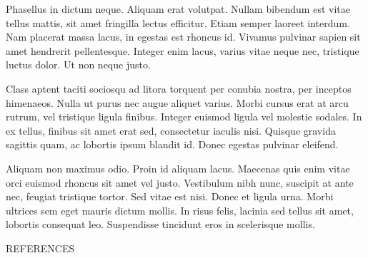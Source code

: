 \documentclass[10pt]{article}
\begin{document}
\begin{multicols}{2}
Phasellus in dictum neque. Aliquam erat volutpat. Nullam bibendum est vitae tellus mattis, sit amet fringilla lectus efficitur. Etiam semper laoreet interdum. Nam placerat massa lacus, in egestas est rhoncus id. Vivamus pulvinar sapien sit amet hendrerit pellentesque. Integer enim lacus, varius vitae neque nec, tristique luctus dolor. Ut non neque justo.

Class aptent taciti sociosqu ad litora torquent per conubia nostra, per inceptos himenaeos. Nulla ut purus nec augue aliquet varius. Morbi cursus erat at arcu rutrum, vel tristique ligula finibus. Integer euismod ligula vel molestie sodales. In ex tellus, finibus sit amet erat sed, consectetur iaculis nisi. Quisque gravida sagittis quam, ac lobortis ipsum blandit id. Donec egestas pulvinar eleifend.

Aliquam non maximus odio. Proin id aliquam lacus. Maecenas quis enim vitae orci euismod rhoncus sit amet vel justo. Vestibulum nibh nunc, suscipit at ante nec, feugiat tristique tortor. Sed vitae est nisi. Donec et ligula urna. Morbi ultrices sem eget mauris dictum mollis. In risus felis, lacinia sed tellus sit amet, lobortis consequat leo. Suspendisse tincidunt eros in scelerisque mollis.

\renewcommand{\refname}{} %
\vspace{12pt}
{\centering\fontsize{10pt}{12pt}\selectfont\scshape REFERENCES\par}
\vspace{-32pt} %




\end{multicols}
\end{document}
